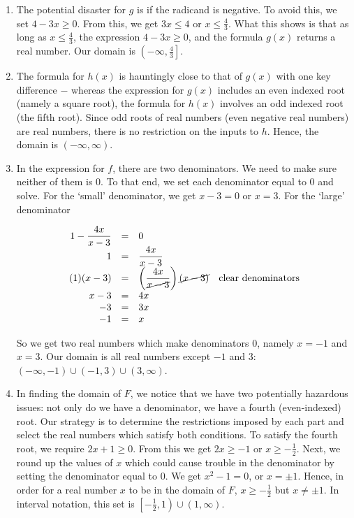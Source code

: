 {
\begin{enumerate}


\item  The potential disaster for $g$ is if the radicand is negative.  To avoid this, we set $4 - 3x \geq 0$. From this, we get $3x \leq 4$ or $x \leq \frac{4}{3}$.  What this shows is that as long as $x \leq \frac{4}{3}$, the expression $4 - 3x \geq 0$, and the formula $g(x)$ returns a real number.  Our domain is $\left(-\infty, \frac{4}{3}\right]$.

\item  The formula for $h(x)$ is hauntingly close to that of $g(x)$ with one key difference $-$ whereas the expression for $g(x)$ includes an even indexed root (namely a square root), the formula for $h(x)$ involves an odd indexed root (the fifth root).  Since odd roots of real numbers (even negative real numbers) are real numbers, there is no restriction on the inputs to $h$.  Hence, the domain is $(-\infty, \infty)$.


\item  In the expression for $f$, there are two denominators.  We need to make sure neither of them is $0$.  To that end, we set each denominator equal to $0$ and solve.  For the `small' denominator, we get $x - 3 = 0$ or $x=3$.  For the `large' denominator

\setlength{\extrarowheight}{10pt}

\[ \begin{array}{rclr}  
1 - \dfrac{4x}{x-3} & = & 0  & \\
                  1 & = & \dfrac{4x}{x-3} & \\ 
           (1)(x-3) & = & \left(\dfrac{4x}{\cancel{x-3}}\right)\cancel{(x-3)} & \mbox{clear denominators}  \\
              x - 3 & = &  4x & \\
                 -3 & = & 3x \\
                 -1 & = & x 
\end{array} \]

\setlength{\extrarowheight}{2pt} 
So we get two real numbers which make denominators $0$, namely $x = -1$ and $x=3$.  Our domain is all real numbers except $-1$ and $3$:  $(-\infty, -1) \cup (-1,3) \cup (3, \infty)$.


\item  In finding the domain of $F$, we notice that we have two potentially hazardous issues:  not only do we have a denominator, we have a fourth (even-indexed) root.  Our strategy is to determine the restrictions imposed by each part and select the real numbers which satisfy both conditions.  To satisfy the fourth root,  we require $2x+1 \geq 0$.  From this we get $2x \geq -1$ or $x \geq -\frac{1}{2}$.  Next, we round up the values of $x$ which could cause trouble in the denominator by setting the denominator equal to $0$.  We get $x^2 - 1=0$, or $x = \pm 1$.  Hence, in order for a real number $x$ to be in the domain of $F$, $x \geq -\frac{1}{2}$ but $x \neq \pm 1$.  In interval notation, this set is $\left[ -\frac{1}{2}, 1 \right) \cup (1, \infty)$. 


\end{enumerate}}
